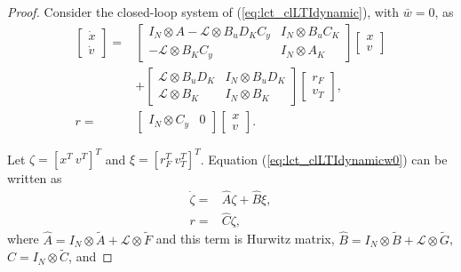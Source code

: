 \begin{proof}
Consider the closed-loop system of  (\ref{eq:lct_clLTIdynamic}), with $\bar{w}=0$, as
\begin{align}\label{eq:lct_clLTIdynamicw0}
\begin{bmatrix}
\dot{x}\\
\dot{v}
\end{bmatrix}
= &
\begin{bmatrix}
I_N \otimes A - \mathcal{L} \otimes B_uD_{K}C_y & I_N \otimes B_uC_K\\
- \mathcal{L} \otimes B_{K}C_y & I_N \otimes A_K
\end{bmatrix}
\begin{bmatrix}
x\\
v
\end{bmatrix} \nonumber \\
& +
\begin{bmatrix}
\mathcal{L} \otimes B_uD_{K} & I_N \otimes B_uD_{K} \\
\mathcal{L} \otimes B_{K}  & I_N \otimes B_{K} 
\end{bmatrix}
\begin{bmatrix}
r_F \\
v_T
\end{bmatrix}, \nonumber \\
r = & 
\begin{bmatrix}
I_N \otimes C_y & 0 
\end{bmatrix}
\begin{bmatrix}
x\\
v
\end{bmatrix}. 
\end{align}
\normalsize


Let $\zeta=  [x^T \ v^T]^T$ and  $\xi = [r_F^T \ v_T^T]^T$. 
Equation (\ref{eq:lct_clLTIdynamicw0}) can be written as
\begin{align}
\dot{\zeta}= & \hat{A}\zeta + \hat{B}\xi,  \nonumber \\
r= &  \hat{C} \zeta,             
\end{align}
where $\hat{A}=I_N \otimes \tilde{A} + \mathcal{L} \otimes \tilde{F}$ and this term is Hurwitz matrix,  $\hat{B}=I_N \otimes \tilde{B} +  \mathcal{L} \otimes \tilde{G}$, $\hat{C}=I_N \otimes \tilde{C}$, and 
 

\end{proof}
